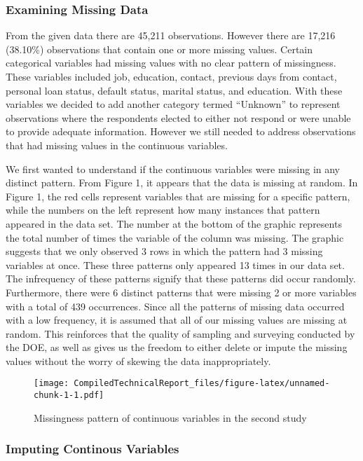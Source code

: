 \documentclass[]{article}
\begin{document}
\hypertarget{examining-missing-data}{%
\subsubsection{Examining Missing Data}\label{examining-missing-data}}

From the given data there are 45,211 observations. However there are
17,216 (38.10\%) observations that contain one or more missing values.
Certain categorical variables had missing values with no clear pattern
of missingness. These variables included job, education, contact,
previous days from contact, personal loan status, default status,
marital status, and education. With these variables we decided to add
another category termed ``Unknown'' to represent observations where the
respondents elected to either not respond or were unable to provide
adequate information. However we still needed to address observations
that had missing values in the continuous variables.

We first wanted to understand if the continuous variables were missing
in any distinct pattern. From Figure 1, it appears that the data is
missing at random. In Figure 1, the red cells represent variables that
are missing for a specific pattern, while the numbers on the left
represent how many instances that pattern appeared in the data set. The
number at the bottom of the graphic represents the total number of times
the variable of the column was missing. The graphic suggests that we
only observed 3 rows in which the pattern had 3 missing variables at
once. These three patterns only appeared 13 times in our data set. The
infrequency of these patterns signify that these patterns did occur
randomly. Furthermore, there were 6 distinct patterns that were missing
2 or more variables with a total of 439 occurrences. Since all the
patterns of missing data occurred with a low frequency, it is assumed
that all of our missing values are missing at random. This reinforces
that the quality of sampling and surveying conducted by the DOE, as well
as gives us the freedom to either delete or impute the missing values
without the worry of skewing the data inappropriately.

\begin{figure}
\centering
\texttt{[image: CompiledTechnicalReport\_files/figure-latex/unnamed-chunk-1-1.pdf]}
\caption{Missingness pattern of continuous variables in the second
study}
\end{figure}

\hypertarget{imputing-continous-variables}{%
\subsubsection{Imputing Continous
Variables}\label{imputing-continous-variables}}
\end{document}
